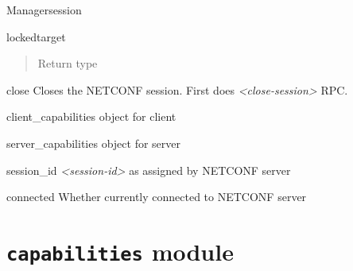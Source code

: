 \documentclass[a4paper,10pt,english]{manual}
\begin{document}
\begin{classdesc}{Manager}{session}
\begin{methoddesc}{locked}{target}
\begin{quote}
\begin{description}
\item[Return type]
\hyperlink{ncclient.operations.LockContext}{}

\end{description}\end{quote}
\end{methoddesc}

\hypertarget{ncclient.manager.Manager.close}{}\begin{methoddesc}{close}{}
Closes the NETCONF session. First does \emph{\textless{}close-session\textgreater{}} RPC.
\end{methoddesc}

\hypertarget{ncclient.manager.Manager.client_capabilities}{}\begin{memberdesc}{client\_capabilities}
\hyperlink{ncclient.capabilities.Capabilities}{} object for client
\end{memberdesc}

\hypertarget{ncclient.manager.Manager.server_capabilities}{}\begin{memberdesc}{server\_capabilities}
\hyperlink{ncclient.capabilities.Capabilities}{} object for server
\end{memberdesc}

\hypertarget{ncclient.manager.Manager.session_id}{}\begin{memberdesc}{session\_id}
\emph{\textless{}session-id\textgreater{}} as assigned by NETCONF server
\end{memberdesc}

\hypertarget{ncclient.manager.Manager.connected}{}\begin{memberdesc}{connected}
Whether currently connected to NETCONF server
\end{memberdesc}
\end{classdesc}

\resetcurrentobjects
\hypertarget{--doc-userdoc/capabilities}{}

\section{\texttt{capabilities} module}
\hypertarget{module-ncclient.capabilities}{}
\modulesynopsis{}
\end{document}
